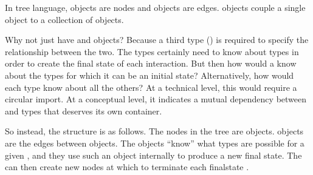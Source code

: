 \documentclass[letterpaper,10pt,english]{sphinxmanual}
\begin{document}
In tree language, {\hyperref[\detokenize{code_structure:scdc.event.Event}]{}} objects are nodes and  objects
are edges.  objects couple a single {\hyperref[\detokenize{code_structure:scdc.event.Event}]{}} object to
a collection of  objects.

Why not just have  and  objects? Because a
third type ({\hyperref[\detokenize{code_structure:scdc.event.Event}]{}}) is required to specify the relationship between the
two. The  types certainly need to know
about  types in order to create the final state of each
interaction. But then how would a  know about
the  types for which it can be an initial state?
Alternatively, how would each  type know about all the
others? At a technical level, this would require a circular import. At a
conceptual level, it indicates a mutual dependency between 
and  types that deserves its own container.

So instead, the structure is as follows. The nodes in the tree
are {\hyperref[\detokenize{code_structure:scdc.event.Event}]{}} objects.  objects are the edges
between {\hyperref[\detokenize{code_structure:scdc.event.Event}]{}} objects. The {\hyperref[\detokenize{code_structure:scdc.event.Event}]{}} objects “know”
what  types are possible for a given , and
they use such an  object internally to produce a new final
state. The {\hyperref[\detokenize{code_structure:scdc.event.Event}]{}} can then create new {\hyperref[\detokenize{code_structure:scdc.event.Event}]{}} nodes at which to
terminate each final\sphinxhyphen{}state .
\end{document}
